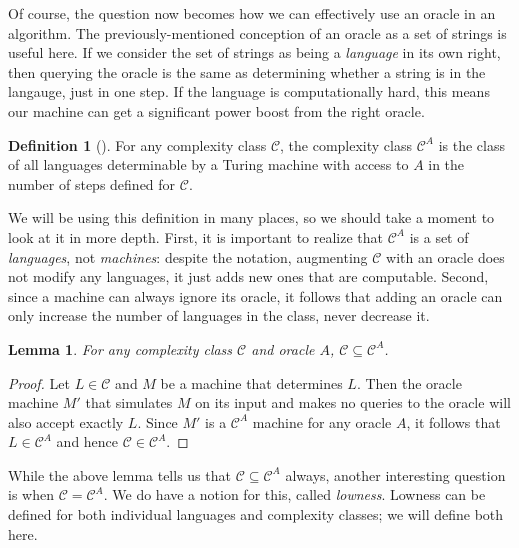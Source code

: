 \documentclass[english,12pt]{reedthesis}
\theoremstyle{plain}
\newtheorem{lemma}[lemma]{Lemma}
\theoremstyle{definition}
\newtheorem{defn}[defn]{Definition}
\theoremstyle{remark}
\begin{document}
Of course, the question now becomes how we can effectively use an oracle in an
algorithm. The previously-mentioned conception of an oracle as a set of strings
is useful here. If we consider the set of strings as being a \emph{language} in
its own right, then querying the oracle is the same as determining whether a
string is in the langauge, just in one step. If the language is computationally
hard, this means our machine can get a significant power boost from the right
oracle.

\begin{defn}[{\cite[Def.\ 2.1]{AW09}}]\label{def:oracle-class}
  For any complexity class $\mathcal{C}$, the complexity class $\mathcal{C}^{A}$ is the class of all
  languages determinable by a Turing machine with access to $A$ in the number of
  steps defined for $\mathcal{C}$.
\end{defn}

We will be using this definition in many places, so we should take a moment to
look at it in more depth. First, it is important to realize that $\mathcal{C}^{A}$ is a
set of \emph{languages}, not \emph{machines}: despite the notation, augmenting
$\mathcal{C}$ with an oracle does not modify any languages, it just adds new ones that are
computable. Second, since a machine can always ignore its oracle, it follows
that adding an oracle can only increase the number of languages in the class,
never decrease it.

\begin{lemma}\label{thm:relativizing-increases}
  For any complexity class $\mathcal{C}$ and oracle $A$, $\mathcal{C} \subseteq \mathcal{C}^{A}$.
\end{lemma}

\begin{proof}
  Let $L \in \mathcal{C}$ and $M$ be a machine that determines $L$. Then the oracle machine
  $M'$ that simulates $M$ on its input and makes no queries to the oracle will
  also accept exactly $L$. Since $M'$ is a $\mathcal{C}^{A}$ machine for any oracle $A$,
  it follows that $L \in \mathcal{C}^{A}$ and hence $\mathcal{C} \in \mathcal{C}^{A}$.
\end{proof}

While the above lemma tells us that $\mathcal{C} \subseteq \mathcal{C}^{A}$ always, another interesting
question is when $\mathcal{C} = \mathcal{C}^{A}$. We do have a notion for this, called
\emph{lowness}. Lowness can be defined for both individual languages and
complexity classes; we will define both here.
\end{document}
